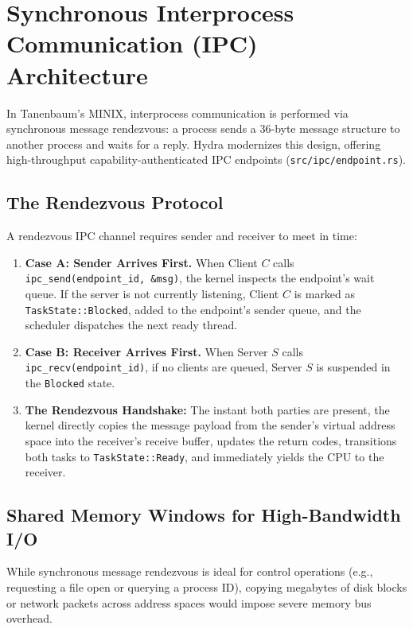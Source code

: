 \section{Synchronous Interprocess Communication (IPC) Architecture}
\label{sec:ipc_architecture}

In Tanenbaum's MINIX, interprocess communication is performed via synchronous message rendezvous: a process sends a 36-byte message structure to another process and waits for a reply. Hydra modernizes this design, offering high-throughput capability-authenticated IPC endpoints (\texttt{src/ipc/endpoint.rs}).

\subsection{The Rendezvous Protocol}
A rendezvous IPC channel requires sender and receiver to meet in time:
\begin{enumerate}
    \item \textbf{Case A: Sender Arrives First.} When Client $C$ calls \texttt{ipc\_send(endpoint\_id, \&msg)}, the kernel inspects the endpoint's wait queue. If the server is not currently listening, Client $C$ is marked as \texttt{TaskState::Blocked}, added to the endpoint's sender queue, and the scheduler dispatches the next ready thread.
    \item \textbf{Case B: Receiver Arrives First.} When Server $S$ calls \texttt{ipc\_recv(endpoint\_id)}, if no clients are queued, Server $S$ is suspended in the \texttt{Blocked} state.
    \item \textbf{The Rendezvous Handshake:} The instant both parties are present, the kernel directly copies the message payload from the sender's virtual address space into the receiver's receive buffer, updates the return codes, transitions both tasks to \texttt{TaskState::Ready}, and immediately yields the CPU to the receiver.
\end{enumerate}

\subsection{Shared Memory Windows for High-Bandwidth I/O}
While synchronous message rendezvous is ideal for control operations (e.g., requesting a file open or querying a process ID), copying megabytes of disk blocks or network packets across address spaces would impose severe memory bus overhead.

